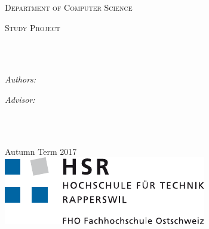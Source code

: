 \begin{titlepage}
\begin{center}

\vspace*{.06\textheight}
{\scshape\LARGE \univname\par} %

{\scshape\large Department of Computer Science\par}\vspace{1.2cm} %
\textsc{\Large Study Project}\\[0.5cm] %

\HRule \\[0.4cm] %
{\huge \bfseries \ttitle\par}\vspace{0.4cm} %
\HRule \\[1.5cm] %
 
\begin{minipage}[t]{0.4\textwidth}
\begin{flushleft} \large
\emph{Authors:}\\
\authorname %
\end{flushleft}
\end{minipage}
\begin{minipage}[t]{0.4\textwidth}
\begin{flushright} \large
\emph{Advisor:} \\
\supname \\[1cm]
\end{flushright}
\end{minipage}\\[3cm]
 
\vfill

{\large Autumn Term 2017}\\[4cm] %
\includegraphics{resources/logo_hsr} %
 
\vfill
\end{center}
\end{titlepage}


